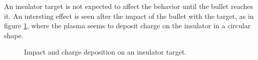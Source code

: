 An insulator target is not expected to affect the behavior until the bullet reaches it. An intersting effect is seen after the impact of the bullet with the target, as in figure \ref{fig:elio_ins}, where the plasma seems to deposit charge on the insulator in a circular shape.
\begin{figure}
 \centering
 \hfill
 \hfill
 \caption{Impact and charge deposition on an insulator target.}
 \label{fig:elio_ins}
\end{figure}


